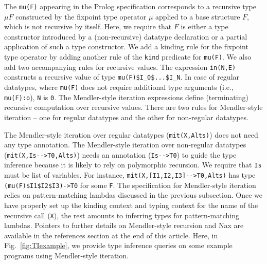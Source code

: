 \documentclass[runningheads,a4paper]{llncs}
\begin{document}
The {\small\verb|mu(F)|} appearing in the Prolog specification corresponds to
a recursive type $\mu F$ constructed by the fixpoint type operator $\mu$
applied to a base structure $F$, which is not recursive by itself. Here,
we require that $F$ is either a type constructor introduced by a (non-recursive)
datatype declaration or a partial application of such a type constructor.
We add a kinding rule for the fixpoint type operator by adding another rule of
the {\small\verb|kind|} predicate for {\small\verb|mu(F)|}. We also add two
accompanying rules for recursive values. The expression {\small\verb|in(N,E)|}
constructs a recursive value of type {\small\verb|mu(F)$I_0$...$I_N|}.
In case of regular datatypes, where \verb|mu(F)| does not require additional
type arguments (i.e., {\small\verb|mu(F):o|}), {\small\verb|N|} is \verb|0|.
The Mendler-style iteration expressions define (terminating) recursive
computation over recursive values. There are two rules for Mendler-style
iteration -- one for regular datatypes and the other for non-regular datatypes.

The Mendler-style iteration over regular datatypes (\verb|mit(X,Alts)|)
does not need any type annotation. The Mendler-style iteration over
non-regular datatypes (\verb|mit(X,Is-->T0,Alts)|) needs an annotation
(\verb|Is-->T0|) to guide the type inference because it is likely to rely on
polymorphic recursion. We require that \texttt{Is} must be list of variables.
For instance, \verb|mit(X,[I1,I2,I3]-->T0,Alts)| has type
\verb|(mu(F)$I1$I2$I3)->T0| for some \verb|F|. The specification for
Mendler-style iteration relies on pattern-matching lambdas discussed in
the previous subsection. Once we have properly set up the kinding context
and typing context for the name of the recursive call (\verb|X|), the rest
amounts to inferring types for pattern-matching lambdas. Pointers to further
details on Mendler-style recursion \cite{vene00phd,AbeMatUus03,AhnShe11} and
Nax \cite{Ahn14thesis} are available in the references section at the end of
this article. Here, in Fig.~\ref{fig:TIexample}, we provide type inference
queries on some example programs using Mendler-style iteration.



\end{document}
